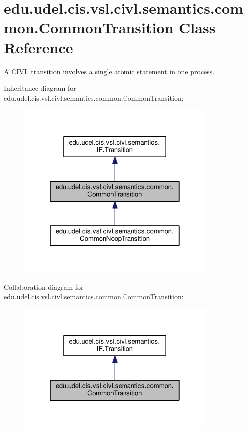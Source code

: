 \hypertarget{classedu_1_1udel_1_1cis_1_1vsl_1_1civl_1_1semantics_1_1common_1_1CommonTransition}{}\section{edu.\+udel.\+cis.\+vsl.\+civl.\+semantics.\+common.\+Common\+Transition Class Reference}
\label{classedu_1_1udel_1_1cis_1_1vsl_1_1civl_1_1semantics_1_1common_1_1CommonTransition}


\hyperlink{structA}{A} \hyperlink{classedu_1_1udel_1_1cis_1_1vsl_1_1civl_1_1CIVL}{C\+I\+V\+L} transition involves a single atomic statement in one process.  




Inheritance diagram for edu.\+udel.\+cis.\+vsl.\+civl.\+semantics.\+common.\+Common\+Transition\+:
\nopagebreak
\begin{figure}[H]
\begin{center}
\leavevmode
\includegraphics[width=274pt]{classedu_1_1udel_1_1cis_1_1vsl_1_1civl_1_1semantics_1_1common_1_1CommonTransition__inherit__graph}
\end{center}
\end{figure}


Collaboration diagram for edu.\+udel.\+cis.\+vsl.\+civl.\+semantics.\+common.\+Common\+Transition\+:
\nopagebreak
\begin{figure}[H]
\begin{center}
\leavevmode
\includegraphics[width=274pt]{classedu_1_1udel_1_1cis_1_1vsl_1_1civl_1_1semantics_1_1common_1_1CommonTransition__coll__graph}
\end{center}
\end{figure}

